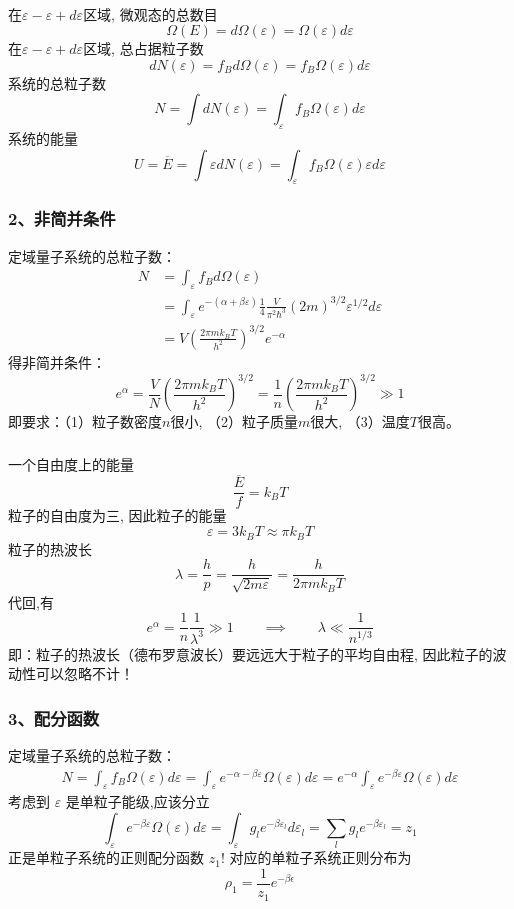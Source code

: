 \begin{frame}
  \frametitle{}
  \emf[几个重要的计算公式：] 

  ~~\\ 
  在$\varepsilon - \varepsilon + d \varepsilon $区域, 微观态的总数目
  \[ \Omega(E) = d\Omega(\varepsilon) = \Omega(\varepsilon) d \varepsilon \]
  在$\varepsilon - \varepsilon + d \varepsilon $区域, 总占据粒子数
  \[ d N(\varepsilon) = f_{B} d\Omega(\varepsilon) = f_{B} \Omega(\varepsilon) d \varepsilon \]
  系统的总粒子数
  \[ N = \int d N(\varepsilon) = \int_{\varepsilon} f_{B} \Omega(\varepsilon) d \varepsilon\]
  系统的能量
  \[ U= \overline{E} = \int \varepsilon d N(\varepsilon) = \int_{\varepsilon} f_{B} \Omega(\varepsilon) \varepsilon d \varepsilon\]
\end{frame} 

\begin{frame}
  \frametitle{ 2、非简并条件}
  定域量子系统的总粒子数：
  \[ \begin{aligned}
    N &= \int_{\varepsilon} f_{B} d\Omega(\varepsilon) \\ 
    &= \int_{\varepsilon} e^{-(\alpha +\beta \varepsilon)} \frac{1}{4} \frac{V}{\pi ^2 \hbar^3} (2m)^{3/2} \varepsilon^{1/2} d \varepsilon \\
    &= V \left( \frac{2 \pi m k_B T}{h^2} \right)^{3/2} e^{-\alpha}
  \end{aligned}\]
  得非简并条件：
  \[ e^{\alpha} = \frac{V}{N} \left( \frac{2 \pi m k_B T}{h^2} \right)^{3/2} = 
  \frac{1}{n} \left( \frac{2 \pi m k_B T}{h^2} \right)^{3/2}  \gg 1\]
  即要求：（1）粒子数密度$n$很小, （2）粒子质量$m$很大, （3）温度$T$很高。
\end{frame} 

\begin{frame}
  \frametitle{}
一个自由度上的能量
\[  \frac{\overline{E}}{f} = k_B T \]
粒子的自由度为三, 因此粒子的能量
\[ \varepsilon = 3 k_B T \approx \pi k_B T\]
粒子的热波长
\[ \lambda = \frac{h}{p} = \frac{h}{\sqrt{2m\varepsilon } } = \frac{h}{2 \pi m k_B T} \]
代回,有
\[ e^{\alpha} = \frac{1}{n} \frac{1}{\lambda ^3} \gg 1 \qquad \implies \qquad \lambda \ll \frac{1}{n^{1/3}}\]
即：粒子的热波长（德布罗意波长）要远远大于粒子的平均自由程, 因此粒子的波动性可以忽略不计！
\end{frame} 

\begin{frame}
  \frametitle{ 3、配分函数}
  定域量子系统的总粒子数：
  \[ \begin{aligned}
    N = \int_{\varepsilon} f_{B} \Omega(\varepsilon) d \varepsilon  
    = \int_{\varepsilon} e^{-\alpha -\beta \varepsilon} \Omega(\varepsilon) d \varepsilon 
    = e^{-\alpha} \int_{\varepsilon} e^{-\beta \varepsilon} \Omega(\varepsilon) d \varepsilon 
  \end{aligned}\]
  考虑到 $\varepsilon$ 是单粒子能级,应该分立
  \[ \int_{\varepsilon} e^{-\beta \varepsilon} \Omega(\varepsilon) d \varepsilon 
  = \int_{\varepsilon} g_l e^{-\beta \varepsilon _l }  d \varepsilon_l 
  = \sum_l  g_l e^{-\beta \varepsilon _l } = z_1
  \]
  正是单粒子系统的正则配分函数 $z_1$! 对应的单粒子系统正则分布为
  \[ \rho _1 = \frac{1}{z_1} e ^ {-\beta \epsilon} \]
\end{frame} 

